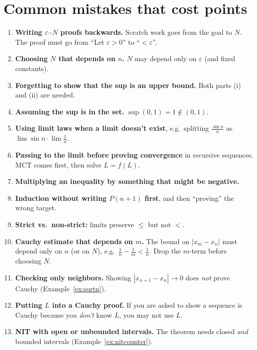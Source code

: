 \documentclass[11pt]{article}
\theoremstyle{definition}
\newcommand{\eps}{\varepsilon}
\begin{document}
\section{Common mistakes that cost points}
\begin{enumerate}
  \item \textbf{Writing $\eps$--$N$ proofs backwards.} Scratch work goes
        from the goal to $N$. The proof must go from ``Let $\eps>0$'' to
        ``$<\eps$''.
  \item \textbf{Choosing $N$ that depends on $n$.} $N$ may depend only on
        $\eps$ (and fixed constants).
  \item \textbf{Forgetting to show that the sup is an upper bound.} Both
        parts (i) and (ii) are needed.
  \item \textbf{Assuming the sup is in the set.} $\sup(0,1)=1\notin(0,1)$.
  \item \textbf{Using limit laws when a limit doesn't exist}, e.g.\
        splitting $\frac{\sin n}{n}$ as $\lim\sin n\cdot\lim\frac1n$.
  \item \textbf{Passing to the limit before proving convergence} in
        recursive sequences. MCT comes first, then solve $L=f(L)$.
  \item \textbf{Multiplying an inequality by something that might be
        negative.}
  \item \textbf{Induction without writing $P(n+1)$ first}, and then
        ``proving'' the wrong target.
  \item \textbf{Strict vs.\ non-strict:} limits preserve $\le$ but not $<$.
  \item \textbf{Cauchy estimate that depends on $m$.} The bound on
        $|x_m-x_n|$ must depend only on $n$ (or on $N$), e.g.\
        $\frac1n-\frac1m<\frac1n$. Drop the $m$-term before choosing $N$.
  \item \textbf{Checking only neighbors.} Showing $|x_{n+1}-x_n|\to0$ does
        \emph{not} prove Cauchy (Example~\ref{ex:sqrtn}).
  \item \textbf{Putting $L$ into a Cauchy proof.} If you are asked to show
        a sequence is Cauchy because you \emph{don't} know $L$, you may not
        use $L$.
  \item \textbf{NIT with open or unbounded intervals.} The theorem needs
        closed \emph{and} bounded intervals (Example~\ref{ex:nitcounter}).
\end{enumerate}
\end{document}
